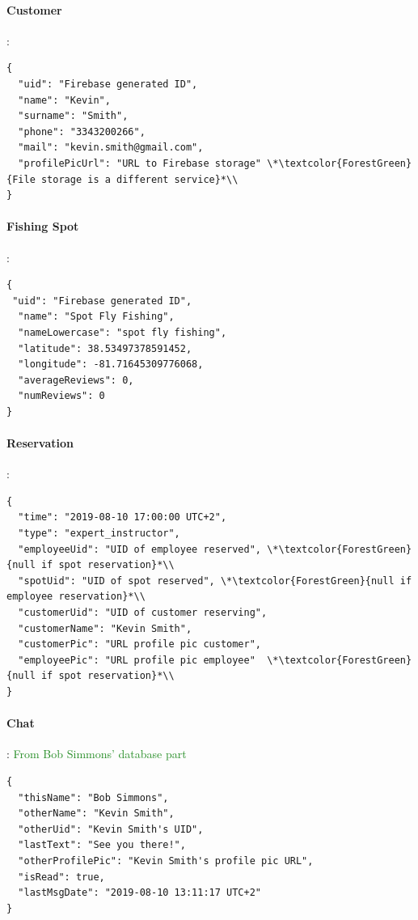 \paragraph*{Customer}:
\begin{lstlisting}
{
  "uid": "Firebase generated ID",
  "name": "Kevin",
  "surname": "Smith",
  "phone": "3343200266",
  "mail": "kevin.smith@gmail.com",
  "profilePicUrl": "URL to Firebase storage" \*\textcolor{ForestGreen}{File storage is a different service}*\\
}
\end{lstlisting}
\paragraph*{Fishing Spot}:
\begin{lstlisting}
{
 "uid": "Firebase generated ID",
  "name": "Spot Fly Fishing",
  "nameLowercase": "spot fly fishing",
  "latitude": 38.53497378591452,
  "longitude": -81.71645309776068,
  "averageReviews": 0,
  "numReviews": 0
}
\end{lstlisting}
\paragraph*{Reservation}:
\begin{lstlisting}
{
  "time": "2019-08-10 17:00:00 UTC+2",
  "type": "expert_instructor",
  "employeeUid": "UID of employee reserved", \*\textcolor{ForestGreen}{null if spot reservation}*\\ 
  "spotUid": "UID of spot reserved", \*\textcolor{ForestGreen}{null if employee reservation}*\\
  "customerUid": "UID of customer reserving",
  "customerName": "Kevin Smith",
  "customerPic": "URL profile pic customer",
  "employeePic": "URL profile pic employee"  \*\textcolor{ForestGreen}{null if spot reservation}*\\
}
\end{lstlisting}
\paragraph*{Chat}: \textcolor{ForestGreen}{From Bob Simmons' database part}
\label{Par:Chat}
\begin{lstlisting}
{
  "thisName": "Bob Simmons",
  "otherName": "Kevin Smith",
  "otherUid": "Kevin Smith's UID",
  "lastText": "See you there!",
  "otherProfilePic": "Kevin Smith's profile pic URL",
  "isRead": true,
  "lastMsgDate": "2019-08-10 13:11:17 UTC+2"
}
\end{lstlisting}
\clearpage

